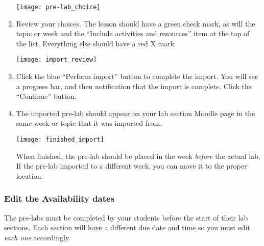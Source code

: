 \documentclass[12pt]{article}
\begin{document}
\begin{enumerate}
	{\centering
	\texttt{[image: pre-lab\_choice]}\par
	}
	
	\item Review your choices. The lesson should have a green check mark, as will the topic or week and the ``Include activities and resources'' item at the top of the list. Everything else should have a red X mark.
	
	{\centering
		\texttt{[image: import\_review]}\par
	}

	\item Click the blue ``Perform import'' button to complete the import. You will see a progress bar, and then notification that the import is complete. Click the ``Continue'' button.
	
	\item The imported pre-lab should appear on your lab section Moodle page in the same week or topic that it was imported from.
	
	{\centering
		\texttt{[image: finished\_import]}\par
	}

	When finished, the pre-lab should be placed in the week \emph{before} the actual lab. If the pre-lab imported to a different week, you can move it to the proper location.

	
\end{enumerate}

\subsubsection*{Edit the Availability dates}

The pre-labs must be completed by your students before the start of their lab sections. Each section will have a different due date and time so you must edit \emph{each one} accordingly.
\end{document}
